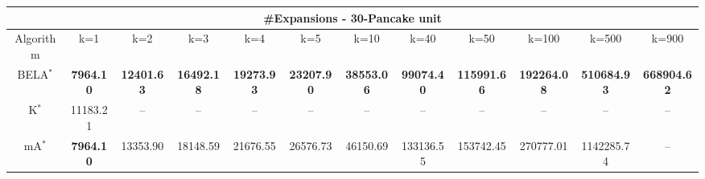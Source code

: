 \begin{tabular}{c|ccccccccccc}\toprule
\multicolumn{12}{c}{#Expansions - 30-Pancake unit}\\ \midrule
Algorithm & k=1 & k=2 & k=3 & k=4 & k=5 & k=10 & k=40 & k=50 & k=100 & k=500 & k=900 \\ \midrule
BELA$^*$ & \textbf{7964.10} & \textbf{12401.63} & \textbf{16492.18} & \textbf{19273.93} & \textbf{23207.90} & \textbf{38553.06} & \textbf{99074.40} & \textbf{115991.66} & \textbf{192264.08} & \textbf{510684.93} & \textbf{668904.62} \\
K$^*$ & 11183.21 & -- & -- & -- & -- & -- & -- & -- & -- & -- & -- \\
mA$^*$ & \textbf{7964.10} & 13353.90 & 18148.59 & 21676.55 & 26576.73 & 46150.69 & 133136.55 & 153742.45 & 270777.01 & 1142285.74 & -- \\ \bottomrule 
\end{tabular}
